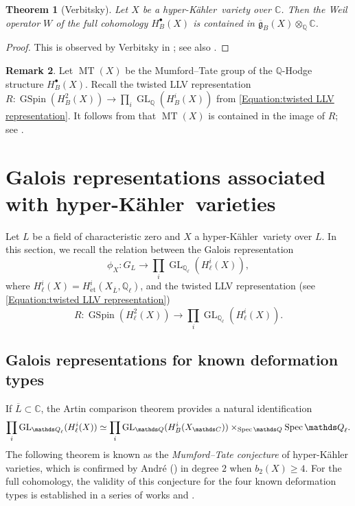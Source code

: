 \documentclass[12pt,reqno]{amsart}
\newtheorem{thm}{Theorem}[section]
\theoremstyle{definition}
\newtheorem{rem}[thm]{Remark}
\newcommand{\Q}{{\mathds Q}}
\newcommand{\C}{{\mathds C}}
\newcommand\GL{\mathop{\mathrm{GL}}\nolimits}
\newcommand\GSpin{\mathop{\mathrm{GSpin}}\nolimits}
\newcommand\Spec{\mathop{\rm Spec}}
\newcommand{\et}{\mathrm{\acute{e}t}}
\newcommand{\hk}{hyper-Kähler~}
\newcommand{\frg}{\mathfrak{g}}
\DeclareMathOperator{\MT}{MT}
\numberwithin{equation}{section}
\begin{document}
\begin{thm}[Verbitsky]\label{thm:MTinsideLLV}
    Let $X$ be a \hk variety over $\C$.
    Then the Weil operator $W$
    of the full cohomology $H^{\bullet}_B(X)$
    is contained in $\overline{\frg}_B(X) \otimes_\Q \C$.
\end{thm}

\begin{proof}
This is observed by Verbitsky in \cite[Theorem 1.4]{Verbitskyaction}; see also \cite[Proposition 2.24]{GKLR}.
\end{proof}

\begin{rem}\label{rem:IsogenyMT} 
Let $\MT(X)$ be the Mumford--Tate group of the $\Q$-Hodge structure $H^{\bullet}_B(X)$.
Recall the twisted LLV representation
$
R \colon \GSpin(H^2_B(X)) \to \prod_i \GL_{\Q}(H^{i}_B(X))
$
from \eqref{Equation:twisted LLV representation}.
It follows from 
that $\MT(X)$ is contained in the image of $R$; see \cite[Lemma 6.7]{FFZ}.
\end{rem}



\section{Galois representations associated with \hk varieties}\label{Section:Galois representations associated with hk varieties}

Let $L$ be a field of characteristic zero and 
$X$ a \hk variety over $L$.
In this section, we recall the relation between the Galois representation
\[
\phi_X \colon G_L \to \prod_i \GL_{\Q_\ell}(H^i_\ell(X)),
\]
where $H^i_\ell(X) = H^i_\et(X_{\overline{L}}, \Q_\ell)$,
and the twisted LLV representation (see \eqref{Equation:twisted LLV representation})
\[
R \colon \GSpin(H^2_\ell(X)) \to \prod_i\GL_{\Q_\ell}(H^i_\ell(X)).
\]


\subsection{Galois representations for known deformation types}\label{Subsection:Galois representations for known deformation types}

If $\overline{L} \subset \C$,
the Artin comparison theorem provides a natural identification
\begin{equation}\label{eq:Artincomparison}
\prod_i \GL_{\Q_\ell}(H^i_\ell(X)) \simeq  \prod_i \GL_\Q(H^i_B(X_\C)) \times_{\Spec \Q} \Spec \Q_\ell.
\end{equation}
The following theorem is known as the \emph{Mumford--Tate conjecture} of hyper-Kähler varieties, which is confirmed by André (\cite{Andre96b}) in degree $2$ when $b_2(X) \geq 4$.
For the full cohomology, the validity of this conjecture for the four known deformation types is established in a series of works \cite[Theorem 1.1]{FloccariMumfordTate} and \cite[Theorem 1.18]{FFZ}.
\end{document}
